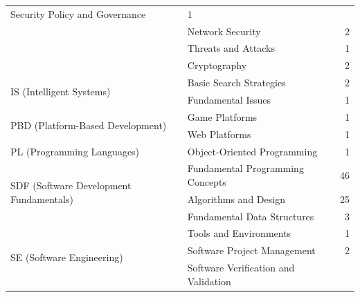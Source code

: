 \documentclass{sig-alternate-05-2015}
\begin{document}
\begin{table}[tb]
\begin{tabularx}{\linewidth}{|X|X|r|}
Security Policy and Governance&


1\\ \cline{2-3}
&


Network Security&


2\\ \cline{2-3}
&


Threats and Attacks&


1\\ \cline{2-3}
&


Cryptography&


2\\ \hline
\multirow{2}{*}{IS (Intelligent Systems)}
&


Basic Search Strategies&


2\\ \cline{2-3}
&


Fundamental Issues&


1\\ \hline
\multirow{2}{*}{PBD (Platform-Based Development)}
&


Game Platforms&


1\\ \cline{2-3}
&


Web Platforms&


1\\ \hline


PL (Programming Languages)&


Object-Oriented Programming&


1\\ \hline
\multirow{3}{*}{SDF (Software Development Fundamentals)}
&


Fundamental Programming Concepts&


46\\ \cline{2-3}
&


Algorithms and Design&


25\\ \cline{2-3}
&


Fundamental Data Structures&


3\\ \hline
\multirow{4}{*}{SE (Software Engineering)}
&


Tools and Environments&


1\\ \cline{2-3}
&


Software Project Management&


2\\ \cline{2-3}
&


Software Verification and Validation&



\end{tabularx}
\end{table}
\end{document}

